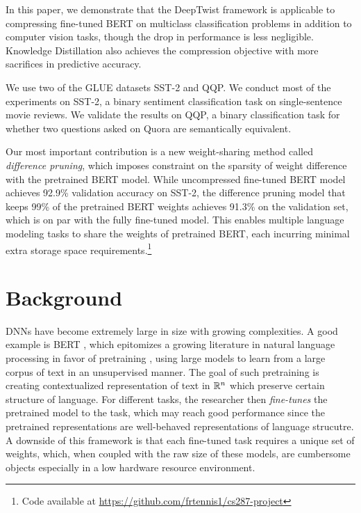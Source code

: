 \documentclass[10pt]{article}
\begin{document}
In this paper, we demonstrate that the DeepTwist framework
\citep{lee2018deeptwist} is applicable to compressing fine-tuned BERT
\citep{devlin2018bert} on multiclass classification problems in addition to
computer vision tasks, though the drop in performance is less negligible.
Knowledge Distillation also achieves the compression objective with more
sacrifices in  predictive accuracy.

We use two of the GLUE datasets SST-2 and QQP. We conduct most of the
experiments
on SST-2, a binary sentiment classification task on single-sentence movie
reviews. We validate the results on QQP, a binary classification task for
whether two questions asked on Quora are semantically equivalent.

Our most important contribution is a new weight-sharing method called
\emph{difference pruning}, which imposes constraint on the sparsity of weight
difference with the pretrained BERT model. While uncompressed fine-tuned BERT
model achieves 92.9\% validation accuracy on SST-2, the difference pruning model
that keeps 99\% of the pretrained BERT weights achieves 91.3\% on the validation
set, which is on par with the fully fine-tuned model. This enables multiple
language modeling tasks to share the weights of pretrained BERT, each incurring
minimal extra storage space requirements.\footnote{Code available at \url{https://github.com/frtennis1/cs287-project}}

\section{Background}

DNNs have become extremely large in size with growing complexities. A good
example is BERT \citep{devlin2018bert}, which epitomizes a growing
literature in natural language processing in favor of pretraining 
\citep{peters2018deep,radford2018improving,radford2019language},
using large models to learn from a large corpus of text in an unsupervised
manner. The goal of such pretraining is creating contextualized
representation of text in $\mathbb{R}^n$ which preserve certain structure of
language. For different tasks, the researcher then \emph{fine-tunes} the
pretrained model to the task, which may reach good performance since the
pretrained representations are well-behaved representations of language
strucutre. A downside of this framework is that each fine-tuned task
requires a unique set of weights, which, when coupled with the raw size of
these models, are cumbersome objects especially in a low hardware resource
environment.
\end{document}
